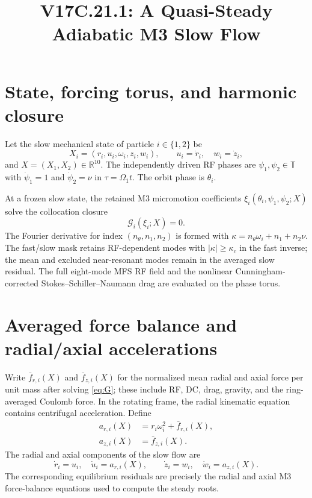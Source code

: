 \documentclass[11pt]{article}
\title{V17C.21.1: A Quasi-Steady Adiabatic M3 Slow Flow}
\author{}
\date{}
\begin{document}
\maketitle

\section{State, forcing torus, and harmonic closure}
Let the slow mechanical state of particle $i\in\{1,2\}$ be
\begin{equation}
 X_i=(r_i,u_i,\omega_i,z_i,w_i),\qquad
 u_i=\dot r_i,\quad w_i=\dot z_i,
\end{equation}
and $X=(X_1,X_2)\in\mathbb R^{10}$. The independently driven RF phases are
$\psi_1,\psi_2\in\mathbb T$ with $\dot\psi_1=1$ and
$\dot\psi_2=\nu$ in $\tau=\Omega_1t$. The orbit phase is $\theta_i$.

At a frozen slow state, the retained M3 micromotion coefficients
$\xi_i(\theta_i,\psi_1,\psi_2;X)$ solve the collocation closure
\begin{equation}
 \mathcal G_i(\xi_i;X)=0.
 \label{eq:G}
\end{equation}
The Fourier derivative for index $(n_\theta,n_1,n_2)$ is formed with
$\kappa=n_\theta\omega_i+n_1+n_2\nu$. The fast/slow mask retains RF-dependent
modes with $|\kappa|\ge\kappa_c$ in the fast inverse; the mean and excluded
near-resonant modes remain in the averaged slow residual. The full eight-mode
MFS RF field and the nonlinear Cunningham-corrected Stokes--Schiller--Naumann
drag are evaluated on the phase torus.

\section{Averaged force balance and radial/axial accelerations}
Write $\bar f_{r,i}(X)$ and $\bar f_{z,i}(X)$ for the normalized mean radial
and axial force per unit mass after solving \eqref{eq:G}; these include RF,
DC, drag, gravity, and the ring-averaged Coulomb force. In the rotating frame,
the radial kinematic equation contains centrifugal acceleration. Define
\begin{align}
 a_{r,i}(X)&=r_i\omega_i^2+\bar f_{r,i}(X),\\
 a_{z,i}(X)&=\bar f_{z,i}(X).
\end{align}
The radial and axial components of the slow flow are
\begin{equation}
 \dot r_i=u_i,\quad \dot u_i=a_{r,i}(X),\qquad
 \dot z_i=w_i,\quad \dot w_i=a_{z,i}(X).
 \label{eq:radialaxial}
\end{equation}
The corresponding equilibrium residuals are precisely the radial and axial
M3 force-balance equations used to compute the steady roots.
\end{document}
